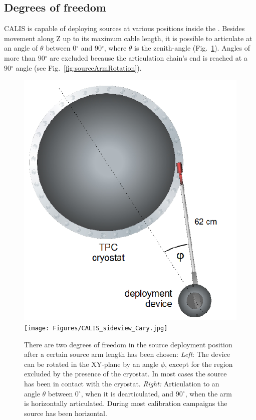 \subsection{Degrees of freedom}

CALIS is capable of deploying sources at various positions inside the \lsv. Besides movement along Z up to its maximum cable length, it is possible to articulate at an angle of $\theta$ between 0$^{\circ}$ and 90$^{\circ}$, where $\theta$ is the zenith-angle (Fig.~\ref{fig:coordinate_system}). Angles of more than 90$^{\circ}$ are excluded because the articulation chain's end is reached at a 90$^{\circ}$ angle (see Fig.~\ref{fig:sourceArmRotation}).

\begin{figure}[htbp]
 \centering
  \includegraphics[height=0.35\textheight,clip=true]{Figures/DeploymentDevice_XY_view}
  \texttt{[image: Figures/CALIS\_sideview\_Cary.jpg]}
  \caption{There are two degrees of freedom in the source deployment position after a certain source arm length has been chosen: \textit{Left}: The device can be rotated in the XY-plane by an angle $\phi$, except for the region excluded by the presence of the cryostat. In most cases the source has been in contact with the cryostat. 
\textit{Right:} Articulation to an angle $\theta$ between 0$^{\circ}$, when it is dearticulated, and 90$^{\circ}$, when the arm is horizontally articulated. During most calibration campaigns the source has been horizontal.
  \label{fig:coordinate_system}}
\end{figure} 

